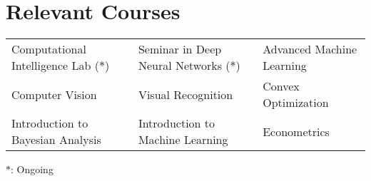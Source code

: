 \setlength\extrarowheight{3pt}  %

\section*{Relevant Courses}
\begin{tabularx}{\textwidth}{L L L}
    Computational Intelligence Lab ($\ast$)&
    Seminar in Deep Neural Networks ($\ast$)&
    Advanced Machine Learning\\
    Computer Vision&
    Visual Recognition&
    Convex Optimization\\
    Introduction to Bayesian Analysis&
    Introduction to Machine Learning&
    Econometrics
\end{tabularx}

\vspace{2mm}
{\small $\ast$: Ongoing}
